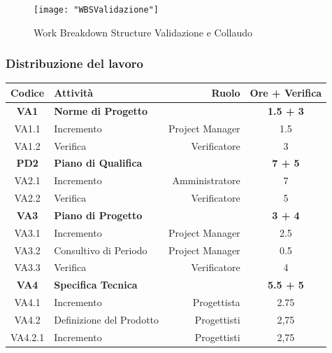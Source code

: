 \documentclass[12pt,a4paper,titlepage]{article}
\begin{document}
	\begin{figure}[p]
		\centering
		\texttt{[image: "WBSValidazione"]}
		\caption{Work Breakdown Structure Validazione e Collaudo}
		\label{fig:WBSValidazione}
	\end{figure}

	\subsubsection{Distribuzione del lavoro}{
		\small
		{\renewcommand\arraystretch{1.1} %
			\begin{tabular}{|c|l|r|c|}
				\hline
				{\textbf{Codice}}&{\textbf{Attività}}&{\textbf{Ruolo}}&{\textbf{Ore + Verifica}}\\
				\hline
				\textbf{VA1} & \textbf{Norme di Progetto} & & \textbf{1.5 + 3 } \\
				
				VA1.1 & Incremento & Project Manager & 1.5 \\
				
				VA1.2 &	Verifica & Verificatore & 3 \\
				\hline
				\textbf{PD2} & \textbf{Piano di Qualifica} & & \textbf{7 + 5 } \\
				
				VA2.1 & Incremento & Amministratore & 7 \\
				
				VA2.2 & Verifica & Verificatore & 5 \\
				\hline
				\textbf{VA3} & \textbf{Piano di Progetto} & & \textbf{3 + 4 } \\
				
				VA3.1 & Incremento & Project Manager & 2.5 \\
				
				VA3.2 & Consultivo di Periodo & Project Manager & 0.5 \\
				
				VA3.3 & Verifica & Verificatore & 4 \\
				\hline
				\textbf{VA4} & \textbf{Specifica Tecnica} & & \textbf{5.5 + 5 } \\
				
				VA4.1 & Incremento & Progettista & 2.75 \\
				
				VA4.2 & Definizione del Prodotto & Progettisti & 2,75 \\
				VA4.2.1 & Incremento & Progettisti & 2,75 \\
				

\end{tabular}}}
\end{document}
